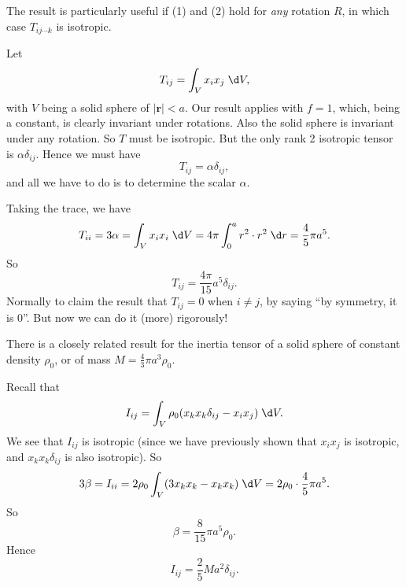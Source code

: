 \documentclass[a4paper]{article}
\begin{document}
The result is particularly useful if (1) and (2) hold for \emph{any} rotation $R$, in which case $T_{ij\cdots k}$ is isotropic.

\begin{eg}
  Let
  \[
    T_{ij} = \int_V x_i x_j \;\d V,
  \]
  with $V$ being a solid sphere of $|\mathbf{r}| < a$. Our result applies with $f = 1$, which, being a constant, is clearly invariant under rotations. Also the solid sphere is invariant under any rotation. So $T$ must be isotropic. But the only rank 2 isotropic tensor is $\alpha \delta_{ij}$. Hence we must have
  \[
    T_{ij} = \alpha \delta_{ij},
  \]
  and all we have to do is to determine the scalar $\alpha$.

  Taking the trace, we have
  \[
    T_{ii} = 3\alpha = \int_V x_i x_i \;\d V = 4\pi \int_0^a r^2 \cdot r^2\;\d r = \frac{4}{5}\pi a^5.
  \]
  So
  \[
    T_{ij} = \frac{4\pi}{15}a^5 \delta_{ij}.
  \]
  Normally to claim the result that $T_{ij} = 0$ when $i \not= j$, by saying ``by symmetry, it is $0$''. But now we can do it (more) rigorously!

  There is a closely related result for the inertia tensor of a solid sphere of constant density $\rho_0$, or of mass $M = \frac{4}{3}\pi a^3 \rho_0$.

  Recall that
  \[
    I_{ij} = \int_V \rho_0 (x_k x_k \delta_{ij} - x_i x_j)\;\d V.
  \]
  We see that $I_{ij}$ is isotropic (since we have previously shown that $x_i x_j$ is isotropic, and $x_kx_k \delta_{ij}$ is also isotropic). So
  \[
    3\beta = I_{ii} = 2\rho_0 \int_V(3x_k x_k - x_k x_k)\;\d V = 2 \rho_0 \cdot \frac{4}{5}\pi a^5.
  \]
  So
  \[
    \beta = \frac{8}{15} \pi a^5 \rho_0.
  \]
  Hence
  \[
    I_{ij} = \frac{2}{5}Ma^2 \delta_{ij}.
  \]
\end{eg}
\end{document}
